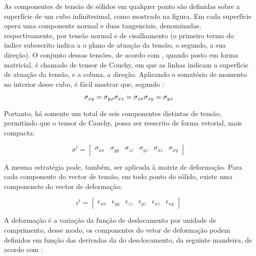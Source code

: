 As componentes de tensão de sólidos em qualquer ponto são definidas sobre a superfície de um cubo infinitesimal, como mostrado na figura. Em cada superfície opera uma componente normal e duas tangenciais, denominadas, respectivamente, por tensão normal e de cisalhamento (o primeiro termo do índice subescrito indica a o plano de atuação da tensão, o segundo, a sua direção). O conjunto dessas tensões, de acordo com , quando posto em forma matricial, é chamado de tensor de Couchy, em que as linhas indicam a superfície de atuação da tensão, e a coluna, a direção. Aplicando o somatório de momento no interior desse cubo, é fácil mostrar que, segundo :

\begin{equation}
    \sigma_{xy} = \sigma_{yx} \\
    \sigma_{xz} = \sigma_{zx} \\
    \sigma_{zy} = \sigma_{yz} \\
\end{equation}

Portanto, há somente um total de seis componentes distintas de tensão, permitindo que o tensor de Cauchy, possa ser reescrito de forma vetorial, mais compacta:

\begin{equation} \label{eq:vetor_tensao}
    \sigma^t =  \begin{bmatrix}
        \sigma_{xx} & \sigma_{yy} & \sigma_{zz} & \sigma_{yz} & \sigma_{xz} & \sigma_{xy}
    \end{bmatrix}
\end{equation}

A mesma estratégia pode, também, ser aplicada à matriz de deformação. Para cada componente do vector de tensão, em todo ponto do sólido, existe uma componenete do vector de deformação:

\begin{equation} \label{eq:vector_deformacao}
    \epsilon^t =  \begin{bmatrix}
        \epsilon_{xx} & \epsilon_{yy} & \epsilon_{zz} & \epsilon_{yz} & \epsilon_{xz} & \epsilon_{xy}
     \end{bmatrix}
\end{equation}

A deformação é a variação da função de deslocamento por unidade de comprimento, desse modo, os componentes do vetor de deformação podem definidos em função das derivadas da do desclocamento, da seguinte mandeira, de acordo com :

